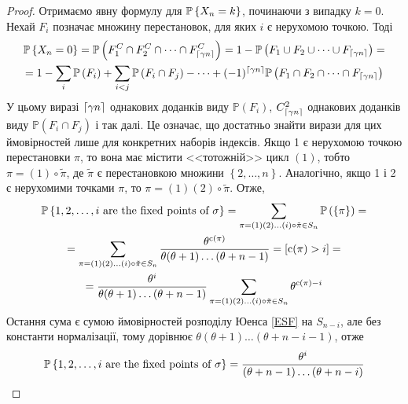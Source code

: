 \begin{proof}
    Отримаємо явну формулу для $\P{X_n = k}$, починаючи з випадку $k=0$.
    Нехай $F_i$ позначає множину перестановок, для яких $i$ є нерухомою точкою. Тоді
    \begin{gather*}
        \P{X_n = 0} = \mathbb{P}\left( F_1^C \cap F_2^C \cap \dots \cap F_{\ceil*{\g n}}^C\right) = 
        1 - \mathbb{P}\left( F_1 \cup F_2 \cup \dots \cup F_{\ceil*{\g n}}\right) = \\ =
        1 - 
            \sum_{i} \mathbb{P}\left(F_i\right) +
            \sum_{i<j} \mathbb{P}\left(F_i \cap F_j\right) - \dots
            + (-1)^{\ceil*{\g n}}\mathbb{P}\left(F_1 \cap F_2 \cap \dots \cap F_{\ceil*{\g n}} \right)
    \end{gather*}
    У цьому виразі $\ceil*{\g n}$ однакових доданків виду $\mathbb{P}\left(F_i\right)$,
    $C_{\ceil*{\g n}}^2$ однакових доданків виду $\mathbb{P}\left(F_i \cap F_j\right)$ і так далі.
    Це означає, що достатньо знайти вирази для цих ймовірностей лише для конкретних наборів індексів.
    Якщо 1 є нерухомою точкою перестановки $\pi$, то вона має містити <<тотожній>>
    цикл $(1)$, тобто $\pi = (1) \circ \tilde{\pi}$, де 
    $\tilde{\pi}$ є перестановкою множини $\left\{2, \dots, n\right\}$.
    Аналогічно, якщо 1 і 2 є нерухомими точками $\pi$,
    то $\pi = (1) (2) \circ \tilde{\pi}$.
    Отже,
    \begin{gather*}
        \P{1, 2, \dots, i \text{ are the fixed points of }\sigma} = 
        \sum_{\pi = (1) (2) \dots (i) \circ \tilde{\pi} \in S_n}
        \mathbb{P}\left(\{\pi\}\right) = \\ =
        \sum_{\pi = (1) (2) \dots (i) \circ \tilde{\pi} \in S_n}
        \frac{
            \theta^{\cycle(\pi)}
        }{
            \theta (\theta + 1) \dots (\theta + n - 1)
        } = \left[\cycle(\pi) > i\right] = \\ =
        \frac{
            \theta^i
        }{
            \theta (\theta + 1) \dots (\theta + n - 1)
        } \sum_{\pi = (1) (2) \dots (i) \circ \tilde{\pi} \in S_n} \theta^{\cycle(\pi) - i}
    \end{gather*} 
    Остання сума є сумою ймовірностей розподілу Юенса \eqref{ESF} на $S_{n-i}$, 
    але без константи нормалізації, тому дорівнює
    $\theta (\theta + 1) \dots (\theta + n - i - 1)$, отже
    \begin{gather*}
        \P{1, 2, \dots, i \text{ are the fixed points of }\sigma} = 
        \frac{\theta^i}{
            (\theta + n - 1) \dots (\theta + n - i)
        }

\end{gather*}
\end{proof}
